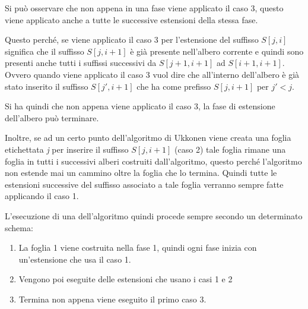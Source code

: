 Si può osservare che non appena in una fase viene applicato il caso 3, questo viene applicato anche a tutte le successive estensioni della stessa fase.

Questo perché, se viene applicato il caso 3 per l'estensione del suffisso $S[j,i]$ significa che il suffisso $S[j,i+1]$ è già presente nell'albero corrente e quindi sono presenti anche tutti i suffissi successivi da $S[j+1,i+1]$ ad $S[i+1,i+1]$.
Ovvero quando viene applicato il caso 3 vuol dire che all'interno dell'albero è già stato inserito il suffisso $S[j',i+1]$ che ha come prefisso $S[j,i+1]$ per $j' < j$.

Si ha quindi che non appena viene applicato il caso 3, la fase di estensione dell'albero può terminare.

Inoltre, se ad un certo punto dell'algoritmo di Ukkonen viene creata una foglia etichettata \textit{j} per inserire il suffisso $S[j,i+1]$ (caso 2) tale foglia rimane una foglia in tutti i successivi alberi costruiti dall'algoritmo, questo perché l'algoritmo non estende mai un cammino oltre la foglia che lo termina. Quindi tutte le estensioni successive del suffisso associato a tale foglia verranno sempre fatte applicando il caso 1.

L'esecuzione di una dell'algoritmo quindi procede sempre secondo un determinato schema:

\begin{enumerate}
	\item La foglia 1 viene costruita nella fase 1, quindi ogni fase inizia con un'estensione che usa il caso 1.
	\item Vengono poi eseguite delle estensioni che usano i casi 1 e 2
	\item Termina non appena viene eseguito il primo caso 3.
\end{enumerate}







